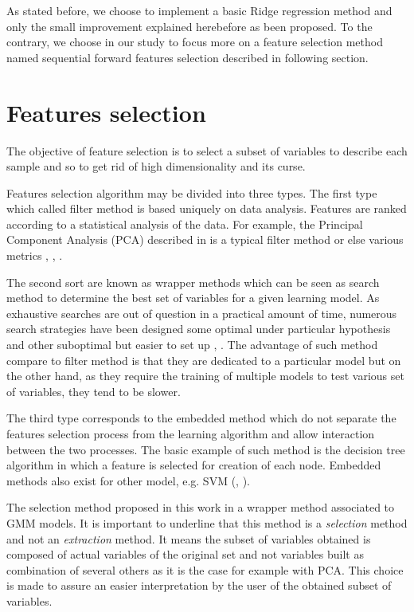 \documentclass[a4paper,11pt,DIV=16,abstracton]{scrartcl}
\begin{document}
    As stated before, we choose to implement a basic Ridge regression method and only the small improvement explained herebefore as been proposed. To the contrary, we choose in our study to focus more on a feature selection method named sequential forward features selection described in following section.

\section{Features selection}
\label{sec:selection}

The objective of feature selection is to select a subset of variables to describe each sample and so to get rid of high dimensionality and its curse.

Features selection algorithm may be divided into three types. The first type which called filter method is based uniquely on data analysis. Features are ranked according to a statistical analysis of the data. For example, the Principal Component Analysis (PCA) described in \cite{jimenez1998supervised} is a typical filter method or else various metrics \cite{bruzzone1995extension}, \cite{biesiada2007feature}, \cite{demir2008phase}.

The second sort are known as wrapper methods which can be seen as search method to determine the best set of variables for a given learning model. As exhaustive searches are out of question in a practical amount of time, numerous search strategies have been designed some optimal under particular hypothesis \cite{narendra1977branch} and other suboptimal but easier to set up \cite{whitney1971direct}, \cite{somol1999adaptive}. The advantage of such method compare to filter method is that they are dedicated to a particular model but on the other hand, as they require the training of multiple models to test various set of variables, they tend to be slower.

The third type corresponds to the embedded method which do not separate the features selection process from the learning algorithm and allow interaction between the two processes. The basic example of such method is the decision tree algorithm in which a feature is selected for creation of each node. Embedded methods also exist for other model, e.g. SVM (\cite{guyon2002gene}, \cite{weston2003use}).

The selection method proposed in this work in a wrapper method associated to GMM models. It is important to underline that this method is a \emph{selection} method and not an \emph{extraction} method. It means the subset of variables obtained is composed of actual variables of the original set and not variables built as combination of several others as it is the case for example with PCA. This choice is made to assure an easier interpretation by the user of the obtained subset of variables.
\end{document}
